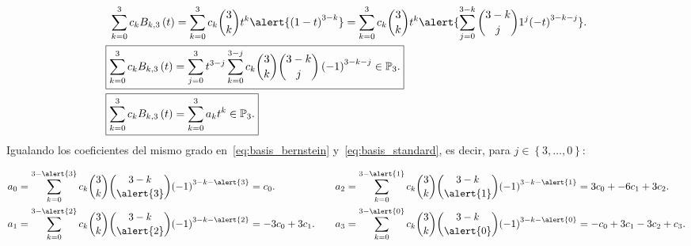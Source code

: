 \begin{frame}
\begin{solution}
        \begin{align}
            \sum_{k=0}^{3}
            c_{k}
            B_{k,3}\left(t\right)
             & =
            \sum_{k=0}^{3}
            c_{k}
            \binom{3}{k}
            t^{k}
            \alert{
                {\left(1-t\right)}^{3-k}
            }=
            \sum_{k=0}^{3}
            c_{k}\binom{3}{k}t^k
            \alert{
                \sum_{j=0}^{3-k}
                \binom{3-k}{j}
                1^{j}
                    {\left(-t\right)}^{3-k-j}
            }.\notag \\
            \label{eq:basis_bernstein}
            \Aboxed{
                \sum_{k=0}^{3}
                c_{k}
                B_{k,3}\left(t\right)
             & =
                \sum_{j=0}^{3}
                t^{3-j}
                \sum_{k=0}^{3-j}
                c_{k}
                \binom{3}{k}
                \binom{3-k}{j}
                \left(-1\right)^{3-k-j}\in\mathbb{P}_{3}.
            }        \\
            \label{eq:basis_standard}
            \Aboxed{
                \sum_{k=0}^{3}
                c_{k}
                B_{k,3}\left(t\right)
             & =
                \sum_{k=0}^{3}
                a_{k}
                t^{k}\in\mathbb{P}_{3}.
            }
        \end{align}
        Igualando los coeficientes del mismo grado
        en~\eqref{eq:basis_bernstein} y~\eqref{eq:basis_standard},
        es decir, para $j\in\left\{3,\dotsc,0\right\}$:

        \begin{equation*}
            \begin{aligned}
                a_{0} & =
                \sum_{k=0}^{3-\alert{3}}
                c_{k}
                \binom{3}{k}
                \binom{3-k}{\alert{3}}
                {\left(-1\right)}^{3-k-\alert{3}}=
                c_{0}.    \\
                a_{1} & =
                \sum_{k=0}^{3-\alert{2}}
                c_{k}
                \binom{3}{k}
                \binom{3-k}{\alert{2}}
                {\left(-1\right)}^{3-k-\alert{2}}=
                -3c_{0}+3c_{1}.
            \end{aligned}
            \qquad
            \begin{aligned}
                a_{2} & =
                \sum_{k=0}^{3-\alert{1}}
                c_{k}
                \binom{3}{k}
                \binom{3-k}{\alert{1}}
                {\left(-1\right)}^{3-k-\alert{1}}=
                3c_{0}+-6c_{1}+3c_{2}. \\
                a_{3} & =
                \sum_{k=0}^{3-\alert{0}}
                c_{k}
                \binom{3}{k}
                \binom{3-k}{\alert{0}}
                {\left(-1\right)}^{3-k-\alert{0}}=
                -c_{0}+3c_{1}-3c_{2}+c_{3}.
            \end{aligned}
        \end{equation*}
    \end{solution}
\end{frame}

